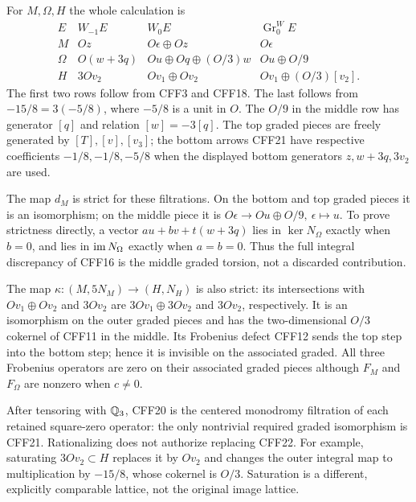 For \(M,\Omega,H\) the whole calculation is
\[
\begin{array}{c|c|c|c}
 E&W_{-1}E&W_0E&\operatorname{Gr}^W_0E\\ \hline
 M&Oz&O\epsilon\oplus Oz&O\epsilon\\
 \Omega&O(w+3q)&Ou\oplus Oq\oplus(O/3)w&Ou\oplus O/9\\
 H&3Ov_2&Ov_1\oplus Ov_2&Ov_1\oplus(O/3)[v_2].
\end{array}
 \tag{CFF22}
\]
The first two rows follow from CFF3 and CFF18. The last follows
from \(-15/8=3(-5/8)\), where \(-5/8\) is a unit in \(O\).
The \(O/9\) in the middle row has generator \([q]\) and relation
\([w]=-3[q]\). The top graded pieces are freely generated by
\([T],[v],[v_3]\); the bottom arrows CFF21 have respective
coefficients \(-1/8,-1/8,-5/8\) when the displayed bottom
generators \(z,w+3q,3v_2\) are used.

The map \(d_M\) is strict for these filtrations. On the bottom
and top graded pieces it is an isomorphism; on the middle piece
it is \(O\epsilon\to Ou\oplus O/9,\ \epsilon\mapsto u\).
To prove strictness directly, a vector \(a u+b v+t(w+3q)\)
lies in \(\ker N_\Omega\) exactly when \(b=0\), and lies in
\(\operatorname{im} N_\Omega\) exactly when \(a=b=0\).
Thus the full integral discrepancy of CFF16 is the middle
graded torsion, not a discarded contribution.

The map \(\kappa:(M,5N_M)\to(H,N_H)\) is also strict:
its intersections with \(Ov_1\oplus Ov_2\) and \(3Ov_2\)
are \(3Ov_1\oplus3Ov_2\) and \(3Ov_2\), respectively.
It is an isomorphism on the outer graded pieces and has the
two-dimensional \(O/3\) cokernel of CFF11 in the middle.
Its Frobenius defect CFF12 sends the top step into the bottom
step; hence it is invisible on the associated graded. All
three Frobenius operators are zero on their associated graded
pieces although \(F_M\) and \(F_\Omega\) are nonzero when \(c\ne0\).

After tensoring with \(\mathbb Q_3\), CFF20 is the centered monodromy
filtration of each retained square-zero operator: the only
nontrivial required graded isomorphism is CFF21. Rationalizing
does not authorize replacing CFF22. For example, saturating
\(3Ov_2\subset H\) replaces it by \(Ov_2\) and changes the
outer integral map to multiplication by \(-15/8\), whose
cokernel is \(O/3\). Saturation is a different, explicitly
comparable lattice, not the original image lattice.

